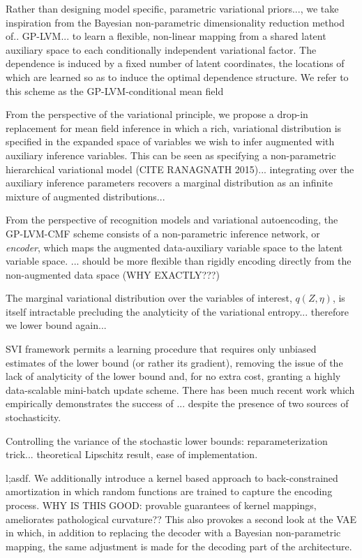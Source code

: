 \documentclass{article}
\begin{document}
Rather than designing model specific, parametric variational priors..., we take inspiration from the Bayesian non-parametric dimensionality reduction method of.. GP-LVM... to learn a flexible, non-linear mapping from a shared latent auxiliary space to each conditionally independent variational factor. The dependence is induced by a fixed number of latent coordinates, the locations of which are learned so as to induce the optimal dependence structure. We refer to this scheme as the GP-LVM-conditional mean field

From the perspective of the variational principle, we propose a drop-in replacement for mean field inference in which a rich, variational distribution is specified in the expanded space of variables we wish to infer augmented with auxiliary inference variables. This can be seen as specifying a non-parametric hierarchical variational model (CITE RANAGNATH 2015)... integrating over the auxiliary inference parameters recovers a marginal distribution as an infinite mixture of augmented distributions...

From the perspective of recognition models and variational autoencoding, the GP-LVM-CMF scheme consists of a non-parametric inference network, or \emph{encoder}, which maps the augmented data-auxiliary variable space to the latent variable space. ... should be more flexible than rigidly encoding directly from the non-augmented data space (WHY EXACTLY???)


The marginal variational distribution over the variables of interest, $q(Z,\eta)$, is itself intractable precluding the analyticity of the variational entropy... therefore we lower bound again...

SVI framework permits a learning procedure that requires only unbiased estimates of the lower bound (or rather its gradient), removing the issue of the lack of analyticity of the lower bound and, for no extra cost, granting a highly data-scalable mini-batch update scheme. There has been much recent work which empirically demonstrates the success of ... despite the presence of two sources of stochasticity.

Controlling the variance of the stochastic lower bounds: reparameterization trick... theoretical Lipschitz result, ease of implementation.


l;asdf. We additionally introduce a kernel based approach to back-constrained amortization in which random functions are trained to capture the encoding process. WHY IS THIS GOOD: provable guarantees of kernel mappings, ameliorates pathological curvature??
This also provokes a second look at the VAE in which, in addition to replacing the decoder with a Bayesian non-parametric mapping, the same adjustment is made for the decoding part of the architecture.
\end{document}
